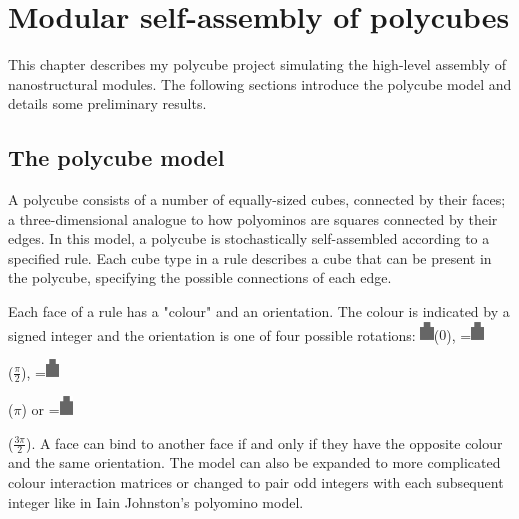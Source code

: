 \chapter{\label{ch:3-polycubes}Modular self-assembly of polycubes}
This chapter describes my polycube project simulating the high-level assembly of nanostructural modules. The following sections introduce the polycube model and details some preliminary results.

\minitoc

\section{The polycube model}
A polycube consists of a number of equally-sized cubes, connected by their faces; a three-dimensional analogue to how polyominos are squares connected by their edges. In this model, a polycube is stochastically self-assembled according to a specified rule. Each cube type in a rule describes a cube that can be present in the polycube, specifying the possible connections of each edge.

Each face of a rule has a "colour" and an orientation. The colour is indicated by a signed integer and the orientation is one of four possible rotations: \includegraphics[width=10pt]{figures/face.eps}\hspace{4pt}(\(0\)),
\begingroup{}=\hbox{\includegraphics[width=10pt,angle=-90]{figures/face.eps}}\parbox{\wd0}{}\endgroup\hspace{4pt}(\(\frac{\pi}{2}\)),
\begingroup{}=\hbox{\includegraphics[width=10pt,angle=180]{figures/face.eps}}\parbox{\wd0}{}\endgroup\hspace{4pt}(\(\pi\)) or
\begingroup{}=\hbox{\includegraphics[width=10pt,angle=90]{figures/face.eps}}\parbox{\wd0}{}\endgroup\hspace{4pt}(\(\frac{3\pi}{2}\)). A face can bind to another face if and only if they have the opposite colour and the same orientation. The model can also be expanded to more complicated colour interaction matrices or changed to pair odd integers with each subsequent integer like in Iain Johnston's polyomino model\cite{ahnert2010self}\cite{johnston2011evolutionary}.

